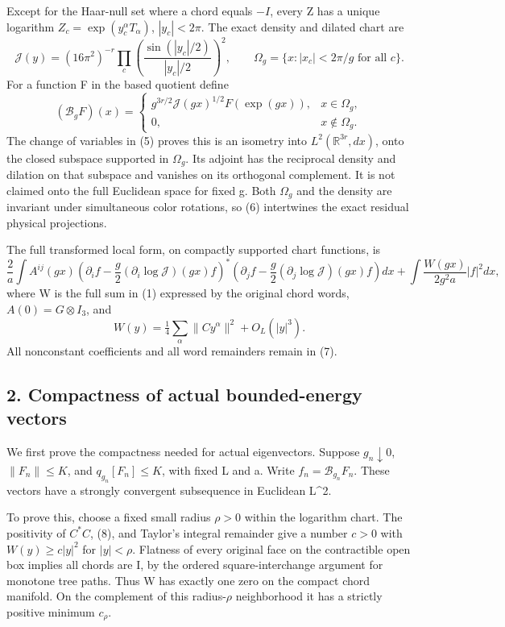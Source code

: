 \documentclass[
  11pt,
]{article}
\begin{document}
Except for the Haar-null set where a chord equals \(-I\), every Z has a
unique logarithm \(Z_c=\exp(y_c^\alpha T_\alpha)\), \(|y_c|<2\pi\). The
exact density and dilated chart are \[
 \mathcal J(y)=(16\pi^2)^{-r}
    \prod_c\left(\frac{\sin(|y_c|/2)}{|y_c|/2}\right)^2,
 \qquad \Omega_g=\{x:|x_c|<2\pi/g\text{ for all }c\}.
                                                               \tag{5}
\] For a function F in the based quotient define \[
 (\mathcal B_gF)(x)=
 \begin{cases}
 g^{3r/2}\mathcal J(gx)^{1/2}F(\exp(gx)),&x\in\Omega_g,\\
 0,&x\notin\Omega_g.
 \end{cases}                                                   \tag{6}
\] The change of variables in (5) proves this is an isometry into
\(L^2(\mathbb R^{3r},dx)\), onto the closed subspace supported in
\(\Omega_g\). Its adjoint has the reciprocal density and dilation on
that subspace and vanishes on its orthogonal complement. It is not
claimed onto the full Euclidean space for fixed g. Both \(\Omega_g\) and
the density are invariant under simultaneous color rotations, so (6)
intertwines the exact residual physical projections.

The full transformed local form, on compactly supported chart functions,
is \[
 \frac2a\int A^{ij}(gx)
  \left(\partial_i f-\frac g2(\partial_i\log\mathcal J)(gx)f\right)^*
  \left(\partial_j f-\frac g2(\partial_j\log\mathcal J)(gx)f\right)dx
 +\int\frac{W(gx)}{2g^2a}|f|^2dx,                           \tag{7}
\] where W is the full sum in (1) expressed by the original chord words,
\(A(0)=G\otimes I_3\), and \[
 W(y)=\tfrac14\sum_\alpha\|Cy^\alpha\|^2+O_L(|y|^3).
                                                               \tag{8}
\] All nonconstant coefficients and all word remainders remain in (7).

\subsection{2. Compactness of actual bounded-energy
vectors}\label{weak-coupling-part-2-compactness-of-actual-bounded-energy-vectors}

We first prove the compactness needed for actual eigenvectors. Suppose
\(g_n\downarrow0\), \(\|F_n\|\le K\), and \(q_{g_n}[F_n]\le K\), with
fixed L and a. Write \(f_n=\mathcal B_{g_n}F_n\). These vectors have a
strongly convergent subsequence in Euclidean L\^{}2.

To prove this, choose a fixed small radius \(\rho>0\) within the
logarithm chart. The positivity of \(C^*C\), (8), and Taylor's integral
remainder give a number \(c>0\) with \(W(y)\ge c|y|^2\) for
\(|y|<\rho\). Flatness of every original face on the contractible open
box implies all chords are I, by the ordered square-interchange argument
for monotone tree paths. Thus W has exactly one zero on the compact
chord manifold. On the complement of this radius-\(\rho\) neighborhood
it has a strictly positive minimum \(c_\rho\).
\end{document}
